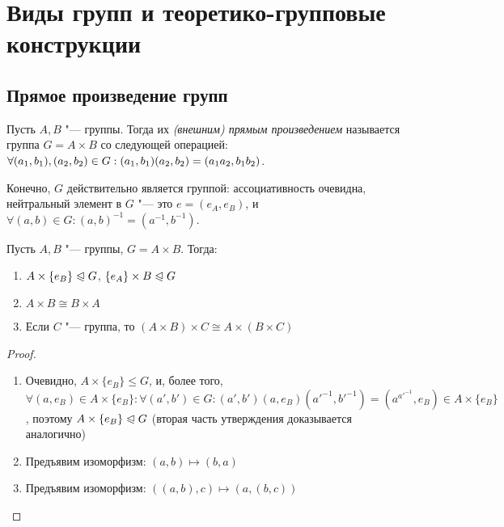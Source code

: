 \section{Виды групп и теоретико-групповые конструкции}

\subsection{Прямое произведение групп}

\begin{definition}
	Пусть $A, B$ "--- группы. Тогда их \textit{(внешним) прямым произведением} называется группа $G = A \times B$ со следующей операцией: $\forall (a_1, b_1), (a_2, b_2) \in G: (a_1, b_1)(a_2, b_2) \hm= (a_1a_2, b_1b_2)$.
\end{definition}

\begin{note}
	Конечно, $G$ действительно является группой: ассоциативность очевидна, нейтральный элемент в $G$ "--- это $e = (e_A, e_B)$, и $\forall (a, b) \in G: (a, b)^{-1} = (a^{-1}, b^{-1})$.
\end{note}

\begin{proposition}
	Пусть $A, B$ "--- группы, $G = A\times B$. Тогда:
	\begin{enumerate}
		\item $A \times \{e_B\} \trianglelefteqslant G$, $\{e_A\} \times B \trianglelefteqslant G$
		\item $A \times B \cong B \times A$
		\item Если $C$ "--- группа, то $(A \times B) \times C \cong A \times (B \times C)$
	\end{enumerate}
\end{proposition}

\begin{proof}~
	\begin{enumerate}
		\item Очевидно, $A \times \{e_B\} \le G$, и, более того, $\forall (a, e_B) \in A \times \{e_B\}: \forall (a', b') \in G: (a', b')(a, e_B)(a'^{-1}, b'^{-1}) = (a^{a'^{-1}}, e_B) \in A \times \{e_B\}$, поэтому $A \times \{e_B\} \trianglelefteqslant G$ (вторая часть утверждения доказывается аналогично)
		\item Предъявим изоморфизм: $(a, b) \mapsto (b, a)$
		\item Предъявим изоморфизм: $((a, b), c) \mapsto (a, (b, c))$
	\end{enumerate}
\end{proof}

